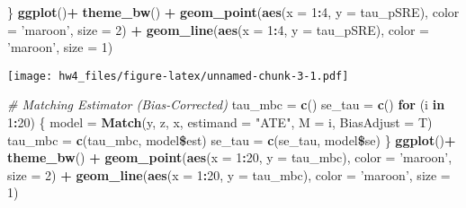 \documentclass[]{article}
\newenvironment{Shaded}{\begin{snugshade}}{\end{snugshade}}
\newcommand{\KeywordTok}[1]{\textcolor[rgb]{0.13,0.29,0.53}{\textbf{#1}}}
\newcommand{\DataTypeTok}[1]{\textcolor[rgb]{0.13,0.29,0.53}{#1}}
\newcommand{\DecValTok}[1]{\textcolor[rgb]{0.00,0.00,0.81}{#1}}
\newcommand{\StringTok}[1]{\textcolor[rgb]{0.31,0.60,0.02}{#1}}
\newcommand{\CommentTok}[1]{\textcolor[rgb]{0.56,0.35,0.01}{\textit{#1}}}
\newcommand{\ControlFlowTok}[1]{\textcolor[rgb]{0.13,0.29,0.53}{\textbf{#1}}}
\newcommand{\OperatorTok}[1]{\textcolor[rgb]{0.81,0.36,0.00}{\textbf{#1}}}
\newcommand{\NormalTok}[1]{#1}
\begin{document}
\begin{Shaded}
\begin{Highlighting}[]
\NormalTok{\}}
\KeywordTok{ggplot}\NormalTok{()}\OperatorTok{+}
\StringTok{  }\KeywordTok{theme_bw}\NormalTok{() }\OperatorTok{+}
\StringTok{  }\KeywordTok{geom_point}\NormalTok{(}\KeywordTok{aes}\NormalTok{(}\DataTypeTok{x =} \DecValTok{1}\OperatorTok{:}\DecValTok{4}\NormalTok{, }\DataTypeTok{y =}\NormalTok{ tau_pSRE), }\DataTypeTok{color =} \StringTok{'maroon'}\NormalTok{, }\DataTypeTok{size =} \DecValTok{2}\NormalTok{) }\OperatorTok{+}
\StringTok{  }\KeywordTok{geom_line}\NormalTok{(}\KeywordTok{aes}\NormalTok{(}\DataTypeTok{x =} \DecValTok{1}\OperatorTok{:}\DecValTok{4}\NormalTok{, }\DataTypeTok{y =}\NormalTok{ tau_pSRE), }\DataTypeTok{color =} \StringTok{'maroon'}\NormalTok{, }\DataTypeTok{size =} \DecValTok{1}\NormalTok{)}
\end{Highlighting}
\end{Shaded}

\texttt{[image: hw4\_files/figure-latex/unnamed-chunk-3-1.pdf]}

\begin{Shaded}
\begin{Highlighting}[]
\CommentTok{# Matching Estimator (Bias-Corrected)}
\NormalTok{tau_mbc =}\StringTok{ }\KeywordTok{c}\NormalTok{()}
\NormalTok{se_tau =}\StringTok{ }\KeywordTok{c}\NormalTok{()}
\ControlFlowTok{for}\NormalTok{ (i }\ControlFlowTok{in} \DecValTok{1}\OperatorTok{:}\DecValTok{20}\NormalTok{)}
\NormalTok{\{}
\NormalTok{  model =}\StringTok{ }\KeywordTok{Match}\NormalTok{(y, z, x, }\DataTypeTok{estimand =} \StringTok{"ATE"}\NormalTok{, }\DataTypeTok{M =}\NormalTok{ i, }\DataTypeTok{BiasAdjust =}\NormalTok{ T)}
\NormalTok{  tau_mbc =}\StringTok{ }\KeywordTok{c}\NormalTok{(tau_mbc, model}\OperatorTok{\$}\NormalTok{est)}
\NormalTok{  se_tau =}\StringTok{ }\KeywordTok{c}\NormalTok{(se_tau, model}\OperatorTok{\$}\NormalTok{se)}
\NormalTok{\}}
\KeywordTok{ggplot}\NormalTok{()}\OperatorTok{+}
\StringTok{  }\KeywordTok{theme_bw}\NormalTok{() }\OperatorTok{+}
\StringTok{  }\KeywordTok{geom_point}\NormalTok{(}\KeywordTok{aes}\NormalTok{(}\DataTypeTok{x =} \DecValTok{1}\OperatorTok{:}\DecValTok{20}\NormalTok{, }\DataTypeTok{y =}\NormalTok{ tau_mbc), }\DataTypeTok{color =} \StringTok{'maroon'}\NormalTok{, }\DataTypeTok{size =} \DecValTok{2}\NormalTok{) }\OperatorTok{+}
\StringTok{  }\KeywordTok{geom_line}\NormalTok{(}\KeywordTok{aes}\NormalTok{(}\DataTypeTok{x =} \DecValTok{1}\OperatorTok{:}\DecValTok{20}\NormalTok{, }\DataTypeTok{y =}\NormalTok{ tau_mbc), }\DataTypeTok{color =} \StringTok{'maroon'}\NormalTok{, }\DataTypeTok{size =} \DecValTok{1}\NormalTok{)}
\end{Highlighting}
\end{Shaded}
\end{document}
